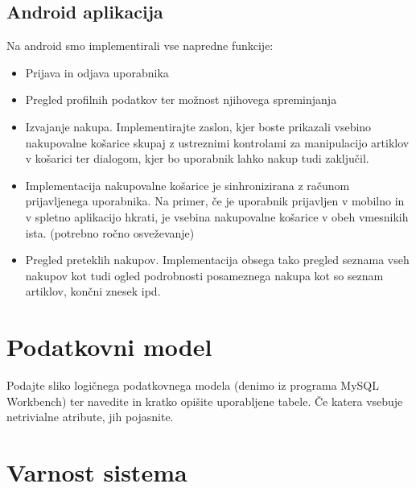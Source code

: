 \documentclass[a4paper,12pt]{report}
\begin{document}
\section{Android aplikacija}
Na android smo implementirali vse napredne funkcije:
\begin{itemize}
    \item Prijava in odjava uporabnika
    \item Pregled profilnih podatkov ter možnost njihovega spreminjanja
    \item Izvajanje nakupa. Implementirajte zaslon, kjer boste prikazali vsebino nakupovalne košarice skupaj z ustreznimi kontrolami za manipulacijo artiklov v košarici ter dialogom, kjer bo uporabnik lahko nakup tudi zaključil.
    \item Implementacija nakupovalne košarice je sinhronizirana z računom prijavljenega uporabnika. Na primer, če je uporabnik prijavljen v mobilno in v spletno aplikacijo hkrati, je vsebina nakupovalne košarice v obeh vmesnikih ista. (potrebno ročno osveževanje)
    \item Pregled preteklih nakupov. Implementacija obsega tako pregled seznama vseh nakupov kot tudi ogled podrobnosti posameznega nakupa kot so seznam artiklov, končni znesek ipd.
\end{itemize}

\chapter{Podatkovni model}

Podajte sliko logičnega podatkovnega modela (denimo iz programa MySQL Workbench) ter navedite in kratko opišite uporabljene tabele. Če katera vsebuje netrivialne atribute, jih pojasnite.


\chapter{Varnost sistema}
\end{document}
